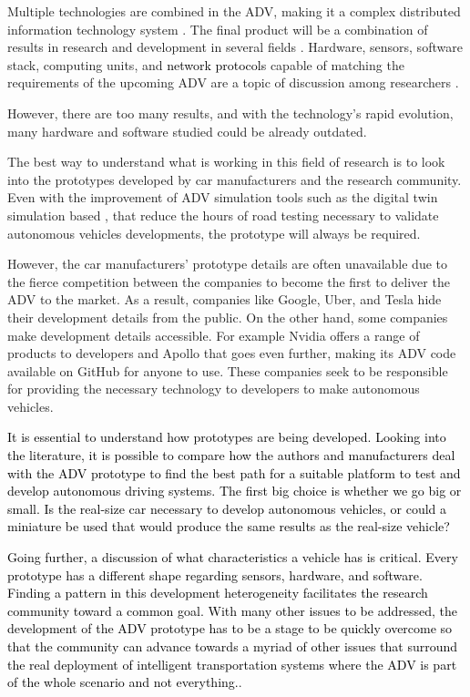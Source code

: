 \documentclass[lettersize,journal]{IEEEtran}
\begin{document}
Multiple technologies are combined in the ADV, making it a complex distributed information technology system \cite{Traub2017}. The final product will be a combination of results in research and development in several fields \cite{Kato2015}. Hardware, sensors, software stack, computing units, and \textcolor{black}{network protocols} capable of matching the requirements of the upcoming ADV are a topic of discussion among researchers \cite{Liu2017,Munir2018,Jo2015,Ziegler2014,Kato2015,tropea2021}.

However, there are too many results, and with the technology's rapid evolution, many hardware and software studied could be already outdated. 

The best way to understand what is working in this field of research is to look into the prototypes developed by car manufacturers and the research community. Even with the improvement of ADV simulation tools such as the digital twin simulation based \cite{yu2022}, that reduce the hours of road testing necessary to validate autonomous vehicles developments, the prototype will always be required. 



However, the car manufacturers' prototype details are often unavailable due to the fierce competition between the companies to become the first to deliver the ADV to the market. As a result, companies like Google, Uber, and Tesla hide their development details from the public. On the other hand, some companies make development details accessible. For example Nvidia offers a range of products to developers \cite{Nvidia} and Apollo \cite{Apollo} that goes even further, making its ADV code available on GitHub for anyone to use. These companies seek to be responsible for providing the necessary technology to developers to make autonomous vehicles.

\textcolor{black}{It is essential to understand how prototypes are being developed. Looking into the literature, it is possible to compare how the authors and manufacturers deal with the ADV prototype to find the best path for a suitable platform to test and develop autonomous driving systems. The first big choice is whether we go big or small. Is the real-size car necessary to develop autonomous vehicles, or could a miniature be used that would produce the same results as the real-size vehicle?}

\textcolor{black}{Going further, a discussion of what characteristics a vehicle has is critical. Every prototype has a different shape regarding sensors, hardware, and software. Finding a pattern in this development heterogeneity facilitates the research community toward a common goal. With many other issues to be addressed, the development of the ADV prototype has to be a stage to be quickly overcome so that the community can advance towards a myriad of other issues that surround the real deployment of intelligent transportation systems where the ADV is part of the whole scenario and not everything.}.
\end{document}
